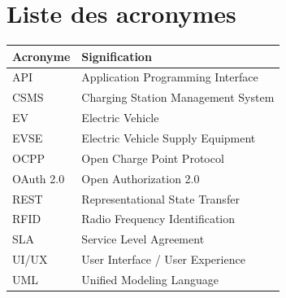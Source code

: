 \chapter*{Liste des acronymes}

\begin{longtable}{|p{2.8cm}|p{11.5cm}|}
  \hline
  \textbf{Acronyme} & \textbf{Signification}\\
  \hline
  API & Application Programming Interface\\\hline
  CSMS & Charging Station Management System\\\hline
  EV & Electric Vehicle\\\hline
  EVSE & Electric Vehicle Supply Equipment\\\hline
  OCPP & Open Charge Point Protocol\\\hline
  OAuth 2.0 & Open Authorization 2.0\\\hline
  REST & Representational State Transfer\\\hline
  RFID & Radio Frequency Identification\\\hline
  SLA & Service Level Agreement\\\hline
  UI/UX & User Interface / User Experience\\\hline
  UML & Unified Modeling Language\\
  \hline
\end{longtable}

